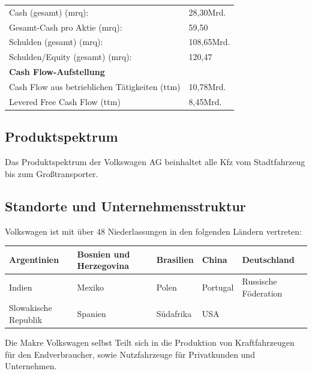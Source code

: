 \documentclass[12pt]{article}
\begin{document}
\begin{table}[h]
\begin{tabular}{|p{}|p{}|}
Cash (gesamt) (mrq): &  	28,30Mrd.  \\  

Gesamt-Cash pro Aktie (mrq): & 59,50   \\  
Schulden (gesamt) (mrq): &   108,65Mrd. \\  
 Schulden/Equity (gesamt) (mrq):&  	120,47  \\  \hline
   \textbf{Cash Flow-Aufstellung}  & \\  \hline

Cash Flow aus betrieblichen Tätigkeiten (ttm) &  10,78Mrd.  \\  
Levered Free Cash Flow (ttm) &  8,45Mrd.  \\  \hline

\end{tabular}
\end{table}
\cite{yahoofinanzenvw}













\subsection{Produktspektrum}
Das Produktspektrum der Volkswagen AG beinhaltet alle Kfz vom Stadtfahrzeug bis zum Großtransporter.

\subsection{Standorte und Unternehmensstruktur}
Volkswagen ist mit über 48 Niederlassungen in den folgenden Ländern vertreten:

\begin{table}[h]
	\begin{tabular}{|l|l|l|l|l|}
		\hline
		Argentinien          & Bosnien und Herzegovina & Brasilien & China    & Deutschland          \\ \hline
		Indien               & Mexiko                  & Polen     & Portugal & Russische Föderation \\ \hline
		Slowakische Republik & Spanien                 & Südafrika & USA      &                      \\ \hline
	\end{tabular}
\end{table}

Die Makre Volkswagen selbst Teilt sich in die Produktion von Kraftfahrzeugen für den Endverbraucher, sowie Nutzfahrzeuge für Privatkunden und Unternehmen.
\end{document}
